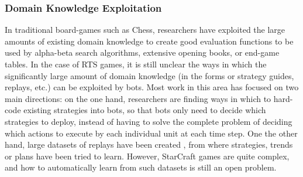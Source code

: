 \documentclass[journal]{IEEEtran}
\begin{document}
\subsubsection{Domain Knowledge Exploitation}
In traditional board-games such as Chess, researchers have exploited the large amounts of existing domain knowledge to create good evaluation functions to be used by alpha-beta search algorithms, extensive opening books, or end-game tables. In the case of RTS games, it is still unclear the ways in which the significantly large amount of domain knowledge (in the forms or strategy guides, replays, etc.) can be exploited by bots. Most work in this area has focused on two main directions: on the one hand, researchers are finding ways in which to hard-code existing strategies into bots, so that bots only need to decide which strategies to deploy, instead of having to solve the complete problem of deciding which actions to execute by each individual unit at each time step. One the other hand, large datasets of replays have been created \cite{WeberCig09,synnaeve2012dataset}, from where strategies, trends or plans have been tried to learn. However, StarCraft games are quite complex, and how to automatically learn from such datasets is still an open problem.
\end{document}
